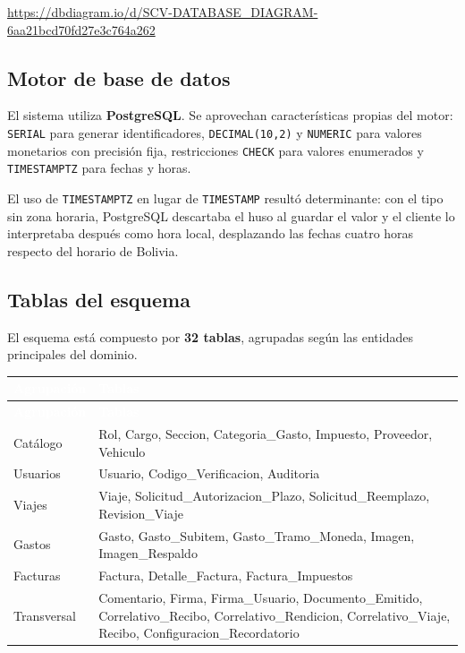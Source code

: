 \documentclass[11pt,letterpaper]{article}
\newcommand{\cabecera}{\rowcolor{maxamPrimario}}
\newcommand{\tth}[1]{\textcolor{white}{\textbf{#1}}}
\begin{document}
\begin{center}
\url{https://dbdiagram.io/d/SCV-DATABASE_DIAGRAM-6aa21bcd70fd27e3c764a262}
\end{center}

\subsection{Motor de base de datos}
El sistema utiliza \textbf{PostgreSQL}. Se aprovechan características propias del motor: \texttt{SERIAL} para generar identificadores, \texttt{DECIMAL(10,2)} y \texttt{NUMERIC} para valores monetarios con precisión fija, restricciones \texttt{CHECK} para valores enumerados y \texttt{TIMESTAMPTZ} para fechas y horas.

El uso de \texttt{TIMESTAMPTZ} en lugar de \texttt{TIMESTAMP} resultó determinante: con el tipo sin zona horaria, PostgreSQL descartaba el huso al guardar el valor y el cliente lo interpretaba después como hora local, desplazando las fechas cuatro horas respecto del horario de Bolivia.

\subsection{Tablas del esquema}
El esquema está compuesto por \textbf{32 tablas}, agrupadas según las entidades principales del dominio.

\begin{xltabular}{\textwidth}{L{3.2cm} Y}
\cabecera \tth{Agrupación} & \tth{Tablas} \\
\endfirsthead
\cabecera \tth{Agrupación} & \tth{Tablas} \\
\endhead
{} Catálogo & Rol, Cargo, Seccion, Categoria\_Gasto, Impuesto, Proveedor, Vehiculo \\
Usuarios & Usuario, Codigo\_Verificacion, Auditoria \\
 Viajes & Viaje, Solicitud\_Autorizacion\_Plazo, Solicitud\_Reemplazo, Revision\_Viaje \\
Gastos & Gasto, Gasto\_Subitem, Gasto\_Tramo\_Moneda, Imagen, Imagen\_Respaldo \\
 Facturas & Factura, Detalle\_Factura, Factura\_Impuestos \\
Transversal & Comentario, Firma, Firma\_Usuario, Documento\_Emitido, Correlativo\_Recibo, Correlativo\_Rendicion, Correlativo\_Viaje, Recibo, Configuracion\_Recordatorio \\
\end{xltabular}
\end{document}
